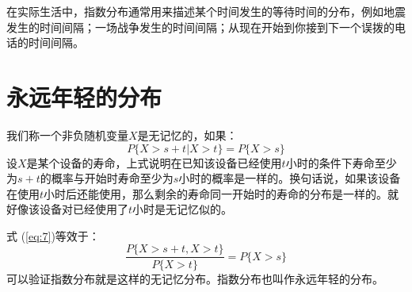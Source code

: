 \documentclass[10pt,a4paper,UTF8]{article}
\begin{document}
在实际生活中，指数分布通常用来描述某个时间发生的等待时间的分布，例如地震发生的时间间隔；一场战争发生的时间间隔；从现在开始到你接到下一个误拨的电话的时间间隔。
\section{永远年轻的分布}
\label{sec:orge83d5dd}


我们称一个非负随机变量\(X\)是无记忆的，如果：
\begin{equation}
\label{eq:7}
P\{ X > s + t | X > t\} = P\{ X > s \}
\end{equation}
设\(X\)是某个设备的寿命，上式说明在已知该设备已经使用\(t\)小时的条件下寿命至少为\(s+t\)的概率与开始时寿命至少为\(s\)小时的概率是一样的。换句话说，如果该设备在使用\(t\)小时后还能使用，那么剩余的寿命同一开始时的寿命的分布是一样的。就好像该设备对已经使用了\(t\)小时是无记忆似的。

式 (\ref{eq:7})等效于：
\begin{equation}
\label{eq:8}
\frac{P\{X > s+t, X > t\}}{P\{X > t\}} = P\{ X > s \}
\end{equation}
可以验证指数分布就是这样的无记忆分布。指数分布也叫作永远年轻的分布。
\end{document}
